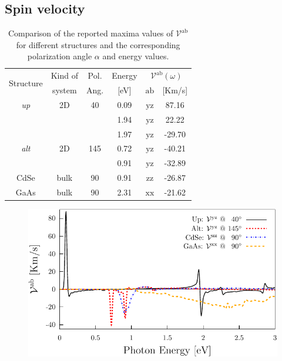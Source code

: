 \documentclass[prb,11pt,tightenlines,twocolumn,aps]{revtex4-1}
\begin{document}
{\color{red}
    
\subsection{Spin velocity} %
\label{sec:res-spin_velocity}

\begin{table}[b]
\begin{tabular}{cccccc}
\hline
\multirow{2}{*}{Structure \quad} & 
Kind of \quad & 
Pol. &
Energy & 
\multicolumn{2}{c}{$\mathcal{V}^{\mathrm{ab}}(\omega)$}\\
\cline{5-6}
& system & Ang. & [eV] & $\mathrm{ab}$ \quad & [Km/s]\\
\hline
\emph{up}    & 2D   & 40    & 0.09  & $\mathrm{yz}$ &  87.16    \\
             &      &       & 1.94  & $\mathrm{yz}$ &  22.22    \\
             &      &       & 1.97  & $\mathrm{yz}$ & -29.70    \\
\emph{alt}   & 2D   & 145   & 0.72  & $\mathrm{yz}$ & -40.21    \\
             &      &       & 0.91  & $\mathrm{yz}$ & -32.89    \\
 CdSe        & bulk & 90    & 0.91  & $\mathrm{zz}$ & -26.87    \\
 GaAs        & bulk & 90    & 2.31  & $\mathrm{xx}$ & -21.62    \\
\hline
\end{tabular}

\caption{\color{red} Comparison of the reported maxima values of
$\mathcal{V}^{\mathrm{ab}}$ for different structures and the corresponding
polarization angle $\alpha$ and energy values.}
\label{tab:vab-str-comp}
\end{table}

\begin{figure}[t]
    \centering
    \includegraphics[width=\linewidth]{plots/vab-str-comp}
    

\end{figure}}
\end{document}
